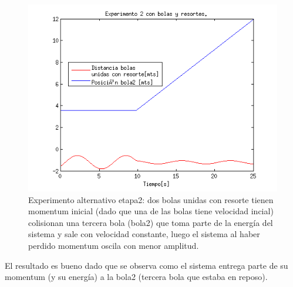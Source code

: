 \documentclass[a4paper,10pt]{article}
\begin{document}
  \begin{figure}[H]
 \centering
 \includegraphics[scale=0.5]{./simulacion_etapa2_experimento2.png}
 \caption{Experimento alternativo etapa2: dos bolas unidas con resorte tienen momentum inicial (dado que una de las bolas tiene velocidad incial) colisionan una tercera bola
 (bola2) que toma parte de la energía del sistema y sale con velocidad constante, luego el sistema al haber perdido momentum oscila con menor amplitud.}
  \label{etapa1.3}
\end{figure}
  
  El resultado es bueno dado que se observa como el sistema entrega parte de su momentum (y su energía) a la bola2 (tercera bola que estaba en reposo).\newline
  
  
 
\end{document}
